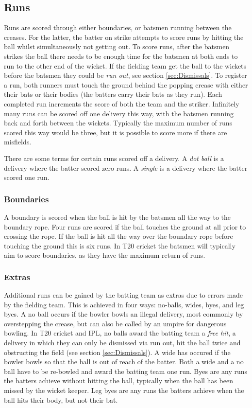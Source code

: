 \documentclass[12pt,a4paper]{report}
\theoremstyle{definition}
\begin{document}
\subsection{Runs} \label{sec:Runs}

Runs are scored through either boundaries, or batsmen running between the creases.
For the latter, the batter on strike attempts to score runs by hitting the ball whilst simultaneously not getting out. 
To score runs, after the batsmen strikes the ball there needs to be enough time for the batsmen at both ends to run to the other end of the wicket.
If the fielding team get the ball to the wickets before the batsmen they could be \emph{run out}, see section \ref{sec:Dismissals}.
To register a run, both runners must touch the ground behind the popping crease with either their bats or their bodies (the batters carry their bats as they run). 
Each completed run increments the score of both the team and the striker.
Infinitely many runs can be scored off one delivery this way, with the batsmen running back and forth between the wickets.
Typically the maximum number of runs scored this way would be three, but it is possible to score more if there are misfields.

There are some terms for certain runs scored off a delivery.
A \emph{dot ball} is a delivery where the batter scored zero runs.
A \emph{single} is a delivery where the batter scored one run.

\subsubsection{Boundaries} \label{sec:Boundaries}

A boundary is scored when the ball is hit by the batsmen all the way to the boundary rope.
Four runs are scored if the ball touches the ground at all prior to crossing the rope. 
If the ball is hit all the way over the boundary rope before touching the ground this is six runs. 
In T20 cricket the batsmen will typically aim to score boundaries, as they have the maximum return of runs.

\subsubsection{Extras}

Additional runs can be gained by the batting team as extras due to errors made by the fielding team. 
This is achieved in four ways: no-balls, wides, byes, and leg byes. 
A no ball occurs if the bowler bowls an illegal delivery, most commonly by overstepping the crease, but can also be called by an umpire for dangerous bowling.
In T20 cricket and IPL, no balls award the batting team a \emph{free hit}, a delivery in which they can only be dismissed via run out, hit the ball twice and obstructing the field (see section \ref{sec:Dismissals}).
A wide has occured if the bowler bowls so that the ball is out of reach of the batter.
Both a wide and a no ball have to be re-bowled and award the batting team one run.
Byes are any runs the batters achieve without hitting the ball, typically when the ball has been missed by the wicket keeper.
Leg byes are any runs the batters achieve when the ball hits their body, but not their bat.
\end{document}
